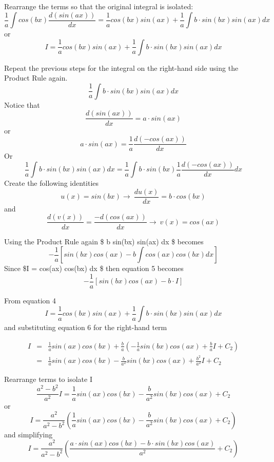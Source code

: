 \documentclass[11pt]{article}
\begin{document}
Rearrange the terms so that the original integral is isolated:
\[\frac {1}{a} \int cos(bx) \frac {d(sin(ax))}{dx} = \frac {1}{a} cos(bx) sin(ax) + \frac {1}{a} \int b \cdot sin(bx) sin(ax) dx \]
or \begin{equation}
I = \frac {1}{a} cos(bx) sin(ax) + \frac {1}{a} \int b \cdot sin(bx) sin(ax) dx 
\label{eq:eq4} \tag{4}
\end{equation}

Repeat the previous steps for the integral on the right-hand side using
the Product Rule again.\\
\[\frac {1}{a} \int b \cdot sin(bx) sin(ax) dx \] Notice that
\[\frac {d (sin(ax))}{dx} = a \cdot sin(ax)\] or
\[a \cdot sin(ax) = \frac {1}{a} \frac {d(-cos(ax))}{dx}\] Or
\[\frac {1}{a} \int b \cdot sin(bx) sin(ax) dx = \frac {1}{a} \int b \cdot sin(bx) \frac {1}{a} \frac {d(-cos(ax))}{dx} dx \]
Create the following identities
\[u(x) = sin(bx) \to\ \frac{d u(x)}{dx} = b \cdot cos(bx)\] and
\[\frac {d (v(x))}{dx} = \frac {-d (cos(ax))}{dx} \to\ v(x) = cos(ax)\]

Using the Product Rule again \$ \int b \cdot sin(bx) sin(ax)
dx \$ becomes \begin{equation}
-\frac{1}{a} [ sin(bx) cos(ax) - b \int cos(ax) cos(bx) dx]
\label{eq:eq5} \tag{5}
\end{equation} Since \$I = \int cos(ax) cos(bx) dx \$ then equation 5
becomes \begin{equation}
-\frac{1}{a} [ sin(bx) cos(ax) - b \cdot I ]
\label{eq:eq6} \tag{6}
\end{equation}

From equation 4
\[I = \frac {1}{a} cos(bx) sin(ax) + \frac {1}{a} \int b \cdot sin(bx) sin(ax) dx \]
and substituting equation 6 for the right-hand term

\begin{eqnarray*}
I & = & \frac {1}{a}sin(ax) cos(bx) + \frac{b}{a} \left(- \frac{1}{a} sin(bx) cos(ax) + \frac {b}{a} I + C_2 \right) \\
& = & \frac {1}{a}sin(ax) cos(bx) - \frac{b}{a^2} sin(bx) cos(ax) + \frac {b^2}{a^2} I + C_2 
\end{eqnarray*}

Rearrange terms to isolate I
\[\frac{a^2-b^2}{a^2} I = \frac {1}{a}sin(ax) cos(bx) - \frac{b}{a^2} sin(bx) cos(ax) + C_2\]
or
\[I = \frac{a^2}{a^2-b^2} \left( \frac {1}{a}sin(ax) cos(bx) - \frac{b}{a^2} sin(bx) cos(ax) + C_2 \right)\]
and simplifying
\[I = \frac{a^2}{a^2-b^2} \left( \frac {a \cdot sin(ax) cos(bx) - b \cdot sin(bx) cos(ax)}{a^2} + C_2 \right)\]
\end{document}
